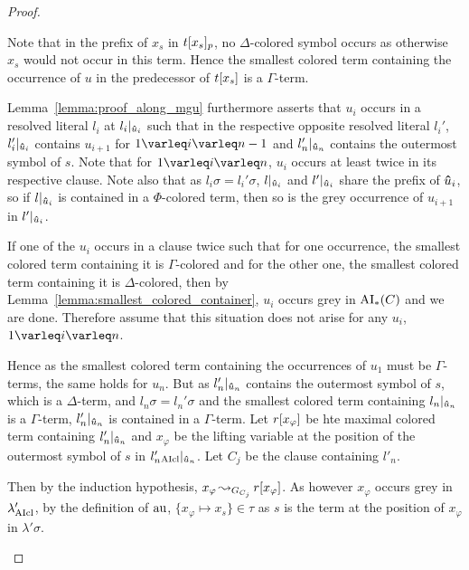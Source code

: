 \documentclass[,%
	draft=false,%
	numbers=noendperiod
	11pt,
	a4paper,
	oneside,%
	openany,
]{memoir}
\begin{document}
\begin{proof}
\begin{description}
\begin{itemize}
\begin{comment}
						\end{itemize}

					\end{comment}



					Note that in the prefix of $x_s$ in $t{[x_s]_{p}}$, no $\Delta$-colored symbol occurs as otherwise $x_s$ would not occur in this term.
					Hence the smallest colored term containing the occurrence of $u$ in the predecessor of $t[x_s]$ is a $\Gamma$-term.

					Lemma~\ref{lemma:proof_along_mgu} furthermore asserts that $u_i$ occurs in a resolved literal $l_i$ at $l_i|_{\bm\hat u_i}$ such that in the respective opposite resolved literal $l_i'$, $l_i'|_{\bm\hat u_i}$ contains $u_{i+1}$ for $1\varleq i\varleq n-1$ and $l_n'|_{\bm\hat u_n}$ contains the outermost symbol of $s$.
					Note that for $1\varleq i \varleq n$, $u_i$ occurs at least twice in its respective clause.
					Note also that as $l_i\sigma = l_i'\sigma$, $l|_{\bm\hat u_i}$ and $l'|_{\bm\hat u_i}$ share the prefix of $\bm\hat u_i$, so if $l|_{\bm\hat u_i}$ is contained in a $\Phi$-colored term, then so is the grey occurrence of $u_{i+1}$ in $l'|_{\bm\hat u_i}$.

					If one of the $u_i$ occurs in a clause twice such that for one occurrence, the smallest colored term containing it is $\Gamma$-colored and for the other one, the smallest colored term containing it is $\Delta$-colored, then by Lemma~\ref{lemma:smallest_colored_container}, $u_i$ occurs grey in $\operatorname{AI}_\mathrm{*}(C)$ and we are done.
					Therefore assume that this situation does not arise for any $u_i$, $1\varleq i \varleq n$.

					Hence as the smallest colored term containing the occurrences of $u_1$ must be $\Gamma$-terms, the same holds for $u_n$.
					But as $l'_n|_{ \bm\hat u_n }$ contains the outermost symbol of $s$, which is a $\Delta$-term, and $l_n\sigma = l_n'\sigma$ and the smallest colored term containing $l_n|_{ \bm\hat u_n }$ is a $\Gamma$-term, 
					$l'_n|_{ \bm\hat u_n }$ is contained in a $\Gamma$-term.
					Let $r[x_\varphi]$ be hte maximal colored term containing $l'_n|_{ \bm\hat u_n }$ and $x_\varphi$ be the lifting variable at the position of the outermost symbol of $s$ in $l'_n{}_{\operatorname{AIcl}}|_{ \bm\hat u_n }$.
					Let $C_j$ be the clause containing $l'_n$.

					Then by the induction hypothesis, $x_\varphi \operatorname{\leadsto}_{G_{C_j}} r[x_\varphi]$.
					As however $x_\varphi$ occurs grey in $\lambda'_{\operatorname{AIcl}}$, by the definition of $\operatorname{au}$, $\{x_\varphi \mapsto x_s\} \in \tau$
					as $s$ is the term at the position of $x_\varphi$ in $\lambda'\sigma$.


\end{itemize}
\end{description}
\end{proof}
\end{document}
